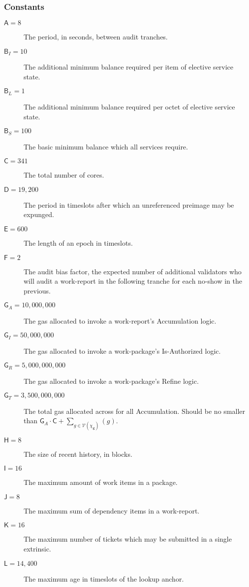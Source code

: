 \subsubsection{Constants}

\begin{description}
  \item[$\mathsf{A} = 8$] The period, in seconds, between audit tranches.
  \item[$\mathsf{B}_I = 10$] The additional minimum balance required per item of elective service state.
  \item[$\mathsf{B}_L = 1$] The additional minimum balance required per octet of elective service state.
  \item[$\mathsf{B}_S = 100$] The basic minimum balance which all services require.
  \item[$\mathsf{C} = 341$] The total number of cores.
  \item[$\mathsf{D} = 19,200$] The period in timeslots after which an unreferenced preimage may be expunged.
  \item[$\mathsf{E} = 600$] The length of an epoch in timeslots.
  \item[$\mathsf{F} = 2$] The audit bias factor, the expected number of additional validators who will audit a work-report in the following tranche for each no-show in the previous.
  \item[$\mathsf{G}_A = 10,000,000$] The gas allocated to invoke a work-report's Accumulation logic.
  \item[$\mathsf{G}_I = 50,000,000$] The gas allocated to invoke a work-package's Is-Authorized logic.
  \item[$\mathsf{G}_R = 5,000,000,000$] The gas allocated to invoke a work-package's Refine logic.
  \item[$\mathsf{G}_T = 3,500,000,000$] The total gas allocated across for all Accumulation. Should be no smaller than $\mathsf{G}_A\cdot\mathsf{C} + \sum_{g \in \mathcal{V}(\chi_\mathbf{g})}(g)$.
  \item[$\mathsf{H} = 8$] The size of recent history, in blocks.
  \item[$\mathsf{I} = 16$] The maximum amount of work items in a package.
  \item[$\mathsf{J} = 8$] The maximum sum of dependency items in a work-report.
  \item[$\mathsf{K} = 16$] The maximum number of tickets which may be submitted in a single extrinsic.
  \item[$\mathsf{L} = 14,400$] The maximum age in timeslots of the lookup anchor.

\end{description}
